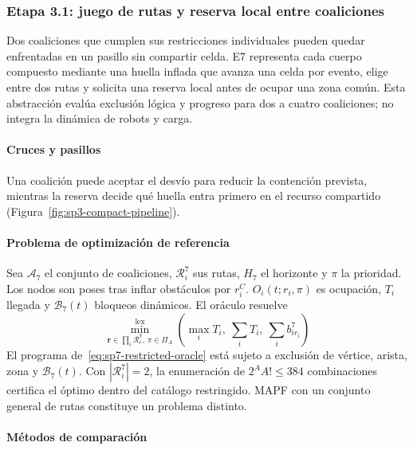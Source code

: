 \subsubsection{Etapa 3.1: juego de rutas y reserva local entre coaliciones}
\label{subsubsec:sp3-traffic}

Dos coaliciones que cumplen sus restricciones individuales pueden quedar enfrentadas en un pasillo sin compartir celda. E7 representa cada cuerpo compuesto mediante una huella inflada que avanza una celda por evento, elige entre dos rutas y solicita una reserva local antes de ocupar una zona común. Esta abstracción evalúa exclusión lógica y progreso para dos a cuatro coaliciones; no integra la dinámica de robots y carga.

\paragraph{Cruces y pasillos}

Una coalición puede aceptar el desvío para reducir la contención prevista, mientras la reserva decide qué huella entra primero en el recurso compartido (Figura~\ref{fig:sp3-compact-pipeline}).


\paragraph{Problema de optimización de referencia}

Sea $\mathcal A_7$ el conjunto de coaliciones, $\mathcal R_i^7$ sus rutas, $H_7$ el horizonte y $\pi$ la prioridad. Los nodos son poses tras inflar obstáculos por $r_i^C$. $O_i(t;r_i,\pi)$ es ocupación, $T_i$ llegada y $\mathcal B_7(t)$ bloqueos dinámicos. El oráculo resuelve
\begin{equation}
\label{eq:sp7-restricted-oracle}
 \min_{\boldsymbol r\in\prod_i\mathcal R_i^7,\,\pi\in\Pi_A}^{\mathrm{lex}}
 \left(\max_iT_i,\ \sum_iT_i,\ \sum_i b_{ir_i}^7\right)
\end{equation}
El programa de~\eqref{eq:sp7-restricted-oracle} está sujeto a exclusión de vértice, arista, zona y $\mathcal B_7(t)$. Con $|\mathcal R_i^7|=2$, la enumeración de $2^AA!\leq384$ combinaciones certifica el óptimo dentro del catálogo restringido. MAPF con un conjunto general de rutas constituye un problema distinto.

\paragraph{Métodos de comparación}


